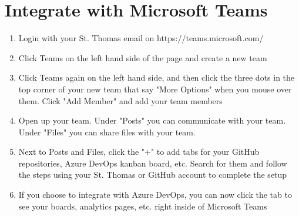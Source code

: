\documentclass{article}
\begin{document}
\section{Integrate with Microsoft Teams}
\begin{enumerate}
    \item Login with your St. Thomas email on https://teams.microsoft.com/
    \item Click Teams on the left hand side of the page and create a new team
    \item Click Teams again on the left hand side, and then click the three dots in the top corner of your new team that say "More Options" when you mouse over them. Click "Add Member" and add your team members
    \item Open up your team. Under "Posts" you can communicate with your team. Under "Files" you can share files with your team.
    \item Next to Posts and Files, click the "+" to add tabs for your GitHub repositories, Azure DevOps kanban board, etc. Search for them and follow the steps using your St. Thomas or GitHub account to complete the setup
    \item If you choose to integrate with Azure DevOps, you can now click the tab to see your boards, analytics pages, etc. right inside of Microsoft Teams
\end{enumerate}
\end{document}
